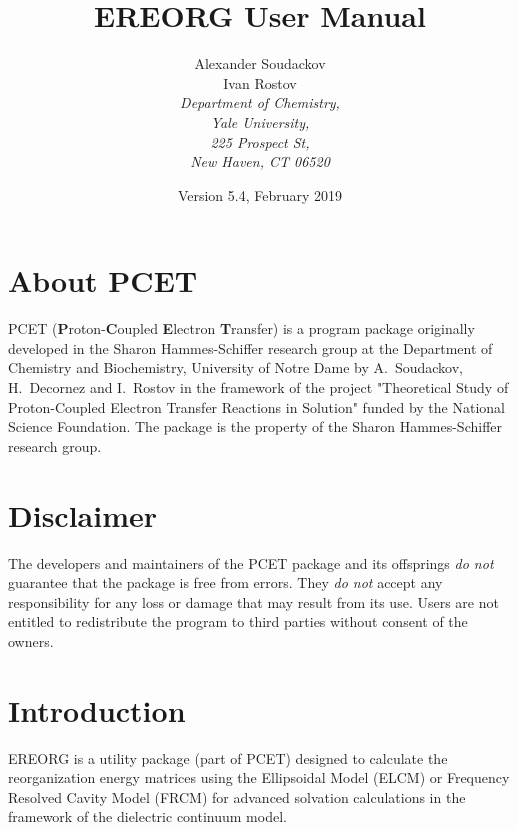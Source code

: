 \documentclass[oneside,11pt,openany]{book}
\begin{document}
%
\title{EREORG User Manual}
%
\author{Alexander Soudackov\\
Ivan Rostov\\
%
\it{\small Department of Chemistry,}\\
\it{\small Yale University,}\\
\it{\small 225 Prospect St,}\\
\it{\small New Haven, CT 06520}}
%
\date{Version 5.4, February 2019}

\maketitle
\frontmatter
\chapter*{About PCET}
PCET ({\bf P}roton-{\bf C}oupled {\bf E}lectron {\bf T}ransfer)
is a program package originally developed in the Sharon Hammes-Schiffer
research group at the Department of Chemistry and Biochemistry,
University of Notre Dame by A.~Soudackov, H.~Decornez and I.~Rostov in
the framework of the project "Theoretical Study of Proton-Coupled
Electron Transfer Reactions in Solution" funded by the National Science
Foundation. The package is the property of the Sharon Hammes-Schiffer
research group.

\chapter*{Disclaimer}
The developers and maintainers of the PCET package and its offsprings
{\it do not} guarantee that the package is free from errors. They
{\it do not} accept any responsibility for any loss or damage that
may result from its use. Users are not entitled to redistribute the
program to third parties without consent of the owners.

\tableofcontents

\mainmatter

\chapter{Introduction}
EREORG is a utility package (part of PCET) designed to calculate the
reorganization energy matrices using the Ellipsoidal Model (ELCM) or
Frequency Resolved Cavity Model (FRCM) for advanced solvation calculations
in the framework of the dielectric continuum model.
\end{document}
